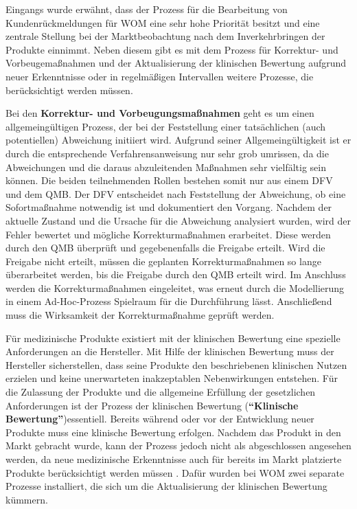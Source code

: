 \documentclass[a4paper,12pt]{report}
\begin{document}
Eingangs wurde erwähnt, dass der Prozess für die Bearbeitung von Kundenrückmeldungen für WOM eine sehr hohe Priorität besitzt und eine zentrale Stellung bei der Marktbeobachtung nach dem Inverkehrbringen der Produkte einnimmt. Neben diesem gibt es mit dem Prozess für Korrektur- und Vorbeugemaßnahmen und der Aktualisierung der klinischen Bewertung aufgrund neuer Erkenntnisse oder in regelmäßigen Intervallen weitere Prozesse, die berücksichtigt werden müssen.

Bei den \textbf{Korrektur- und Vorbeugungsmaßnahmen} geht es um einen allgemeingültigen Prozess, der bei der Feststellung einer tatsächlichen (auch potentiellen) Abweichung initiiert wird. Aufgrund seiner Allgemeingültigkeit ist er durch die entsprechende Verfahrensanweisung nur sehr grob umrissen, da die Abweichungen und die daraus abzuleitenden Maßnahmen sehr vielfältig sein können. Die beiden teilnehmenden Rollen bestehen somit nur aus einem DFV und dem QMB. Der DFV entscheidet nach Feststellung der Abweichung, ob eine Sofortmaßnahme notwendig ist und dokumentiert den Vorgang. Nachdem der aktuelle Zustand und die Ursache für die Abweichung analysiert wurden, wird der Fehler bewertet und mögliche Korrekturmaßnahmen erarbeitet. Diese werden durch den QMB überprüft und gegebenenfalls die Freigabe erteilt. Wird die Freigabe nicht erteilt, müssen die geplanten Korrekturmaßnahmen so lange überarbeitet werden, bis die Freigabe durch den QMB erteilt wird. Im Anschluss werden die Korrekturmaßnahmen eingeleitet, was erneut durch die Modellierung in einem Ad-Hoc-Prozess Spielraum für die Durchführung lässt. Anschließend muss die Wirksamkeit der Korrekturmaßnahme geprüft werden.

Für medizinische Produkte existiert mit der klinischen Bewertung eine spezielle Anforderungen an die Hersteller. Mit Hilfe der klinischen Bewertung muss der Hersteller sicherstellen, dass seine Produkte den beschriebenen klinischen Nutzen erzielen und keine unerwarteten inakzeptablen Nebenwirkungen entstehen. Für die Zulassung der Produkte und die allgemeine Erfüllung der gesetzlichen Anforderungen ist der Prozess der klinischen Bewertung (\textbf{"`Klinische Bewertung"'})essentiell. Bereits während oder vor der Entwicklung neuer Produkte muss eine klinische Bewertung erfolgen. Nachdem das Produkt in den Markt gebracht wurde, kann der Prozess jedoch nicht als abgeschlossen angesehen werden, da neue medizinische Erkenntnisse auch für bereits im Markt platzierte Produkte berücksichtigt werden müssen \citep[vgl.][]{Johner}. Dafür wurden bei WOM zwei separate Prozesse installiert, die sich um die Aktualisierung der klinischen Bewertung kümmern.
\end{document}
